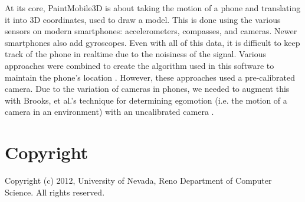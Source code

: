 \documentclass{chi-ext}
\begin{document}
At its core, PaintMobile3D is about taking the motion of a phone and
translating it into 3D coordinates, used to draw a model. This is done using
the various sensors on modern smartphones: accelerometers, compasses, and
cameras. Newer smartphones also add gyroscopes. Even with all of this data, it
is difficult to keep track of the phone in realtime due to the noisiness of
the signal. Various approaches were combined to create the algorithm used in
this software to maintain the phone's location \cite{voigt2011robust}
\cite{hol2007robust}. However, these approaches used a pre-calibrated camera.
Due to the variation of cameras in phones, we needed to augment this with
Brooks, et al.'s technique for determining egomotion (i.e. the motion of a
camera in an environment) with an uncalibrated camera
\cite{brooks1997determining}.

\section{Copyright}
Copyright (c) 2012, University of Nevada, Reno Department of Computer Science.
All rights reserved.

\pagebreak
\end{document}
